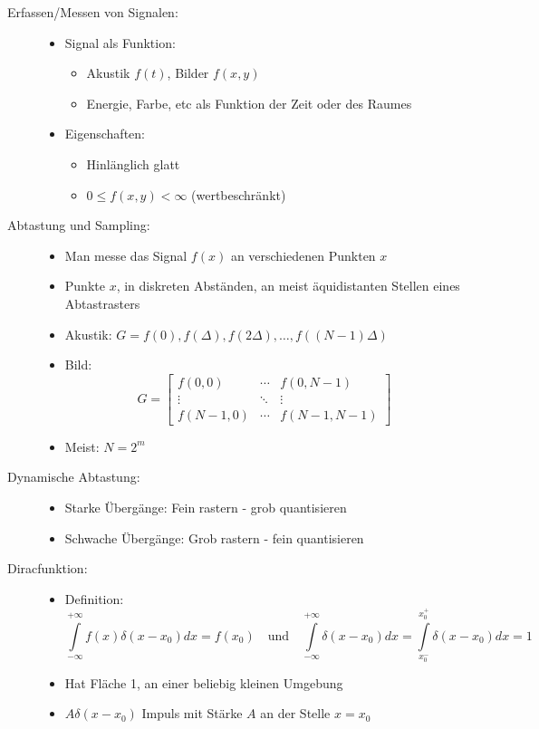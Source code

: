 \begin{description}
\item[Erfassen/Messen von Signalen:] \quad
\begin{itemize}
\item Signal als Funktion: 
\begin{itemize}
	\item Akustik $f(t)$, Bilder $f(x,y)$
	\item Energie, Farbe, etc als Funktion der Zeit oder des Raumes
\end{itemize}
\item Eigenschaften: 
\begin{itemize}
	\item Hinlänglich glatt
	\item $0 \leq f(x,y) < \infty$ (wertbeschränkt)
\end{itemize} 
\end{itemize}
\item[Abtastung und Sampling:] \quad
\begin{itemize}
\item Man messe das Signal $f(x)$ an verschiedenen Punkten $x$
\item Punkte $x$, in diskreten Abständen, an meist äquidistanten Stellen eines Abtastrasters
\item Akustik: $G = f(0), f(\Delta), f(2 \Delta), \dots, f((N-1)\Delta)$
\item Bild: $$G = \left[ \begin{array}{ccc} f(0,0) & \cdots & f(0,N-1) \\ \vdots & \ddots & \vdots \\ f(N-1,0) & \cdots & f(N-1,N-1) \end{array} \right]$$
\item Meist: $N = 2^m$
\end{itemize}
\item[Dynamische Abtastung:] \quad
\begin{itemize}
\item Starke Übergänge: Fein rastern - grob quantisieren
\item Schwache Übergänge: Grob rastern - fein quantisieren
\end{itemize}
\item[Diracfunktion:]\quad
\begin{itemize}
\item Definition: $$\int\limits_{- \infty}^{+ \infty} f(x) \delta(x - x_0) dx = f(x_0) \quad \textrm{und} \quad \int\limits_{- \infty}^{+ \infty} \delta(x - x_0) dx = \int\limits_{x_0^-}^{x_0^+} \delta(x - x_0) dx = 1$$
\item Hat Fläche 1, an einer beliebig kleinen Umgebung
\item $A \delta(x - x_0)$ Impuls mit Stärke $A$ an der Stelle $x = x_0$
\end{itemize}
\end{description}

